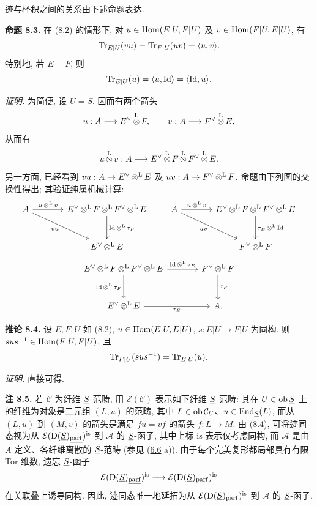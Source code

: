 迹与杯积之间的关系由下述命题表达.

\textbf{命题 8.3.} 在 \hyperlink{sga6.e01.para.8-2}{(8.2)} 的情形下, 对 \(u\in\operatorname{Hom}(E|U,F|U)\) 及 \(v\in\operatorname{Hom}(F|U,E|U)\), 有
\[
  \operatorname{Tr}_{E|U}(vu)=\operatorname{Tr}_{F|U}(uv)=\langle u,v\rangle.
\]
特别地, 若 \(E=F\), 则
\[
  \operatorname{Tr}_{E|U}(u)=\langle u,\operatorname{Id}\rangle=\langle\operatorname{Id},u\rangle.
\]

\emph{证明.} 为简便, 设 \(U=S\). 因而有两个箭头
\[
  u:A\longrightarrow E^\vee\mathop{\otimes}^{\mathrm L} F,
  \qquad
  v:A\longrightarrow F^\vee\mathop{\otimes}^{\mathrm L} E,
\]
从而有
\[
  u\mathop{\otimes}^{\mathrm L} v:A\longrightarrow E^\vee\mathop{\otimes}^{\mathrm L} F\mathop{\otimes}^{\mathrm L} F^\vee\mathop{\otimes}^{\mathrm L} E.
\]
另一方面, 已经看到 \(vu:A\to E^\vee\mathop{\otimes}^{\mathrm L} E\) 及 \(uv:A\to F^\vee\mathop{\otimes}^{\mathrm L} F\). 命题由下列图的交换性得出; 其验证纯属机械计算:
\[
\begin{tikzcd}[column sep=large,row sep=large]
 A \arrow[r,"u\otL v"] \arrow[dr,"vu"'] & E^\vee\otL F\otL F^\vee\otL E \arrow[d,"\Id\otL\tau_F"] \\
 & E^\vee\otL E
\end{tikzcd}
\qquad
\begin{tikzcd}[column sep=large,row sep=large]
 A \arrow[r,"u\otL v"] \arrow[dr,"uv"'] & E^\vee\otL F\otL F^\vee\otL E \arrow[d,"\tau_E\otL\Id"] \\
 & F^\vee\otL F
\end{tikzcd}
\]
\[
\begin{tikzcd}[column sep=large,row sep=large]
E^\vee\otL F\otL F^\vee\otL E \arrow[r,"\Id\otL\tau_E"] \arrow[d,"\Id\otL\tau_F"'] & F^\vee\otL F \arrow[d,"\tau_F"]\\
E^\vee\otL E \arrow[r,"\tau_E"'] & A .
\end{tikzcd}
\]

\textbf{推论 8.4.} 设 \(E,F,U\) 如 \hyperlink{sga6.e01.para.8-2}{(8.2)}, \(u\in\operatorname{Hom}(E|U,E|U)\), \(s:E|U\to F|U\) 为同构. 则 \(sus^{-1}\in\operatorname{Hom}(F|U,F|U)\), 且
\[
  \operatorname{Tr}_{F|U}(sus^{-1})=\operatorname{Tr}_{E|U}(u).
\]

\emph{证明.} 直接可得.

\textbf{注 8.5.} 若 \(\mathcal C\) 为纤维 \(\underline S\)-范畴, 用 \(\mathcal E(\mathcal C)\) 表示如下纤维 \(\underline S\)-范畴: 其在 \(U\in\operatorname{ob}\underline S\) 上的纤维为对象是二元组 \((L,u)\) 的范畴, 其中 \(L\in\operatorname{ob}\mathcal C_U\)、\(u\in\operatorname{End}_{\underline S}(L)\), 而从 \((L,u)\) 到 \((M,v)\) 的箭头是满足 \(fu=vf\) 的箭头 \(f:L\to M\). 由 \hyperlink{sga6.e01.cor.8-4}{(8.4)}, 可将迹同态视为从 \(\mathcal E(\mathrm D(\underline S)_{\underline{\mathrm{parf}}})^{\mathrm{is}}\) 到 \(\mathcal A\) 的 \(\underline S\)-函子, 其中上标 \(\mathrm{is}\) 表示仅考虑同构, 而 \(\mathcal A\) 是由 \(A\) 定义、各纤维离散的 \(\underline S\)-范畴 (参见 (\hyperlink{sga6.e01.rem.6-6}{6.6} a)). 由于每个完美复形都局部具有有限 Tor 维数, 遗忘 \(\underline S\)-函子
\[
  \mathcal E(\mathrm D(\underline S)_{\underline{\mathrm{parf}}})^{\mathrm{is}}
  \longrightarrow
  \mathcal E(\mathrm D(\underline S)_{\mathrm{parf}})^{\mathrm{is}}
\]
在关联叠上诱导同构. 因此, 迹同态唯一地延拓为从 \(\mathcal E(\mathrm D(\underline S)_{\mathrm{parf}})^{\mathrm{is}}\) 到 \(\mathcal A\) 的 \(\underline S\)-函子.

